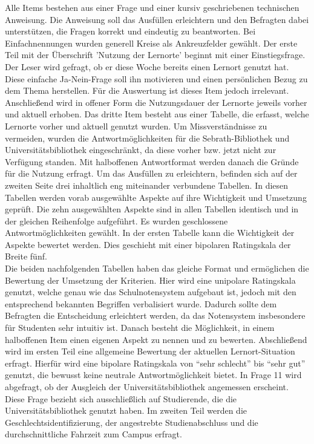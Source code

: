 \documentclass[11pt, a4paper]{article}
\begin{document}
Alle Items bestehen aus einer Frage und einer kursiv geschriebenen technischen Anweisung. Die Anweisung soll das Ausfüllen erleichtern und den Befragten dabei unterstützen, die Fragen korrekt und eindeutig zu beantworten. Bei Einfachnennungen wurden generell Kreise als Ankreuzfelder gewählt.
Der erste Teil mit der Überschrift 'Nutzung der Lernorte' beginnt mit einer Einstiegsfrage.
Der Leser wird gefragt, ob er diese Woche bereits einen Lernort genutzt hat. Diese einfache Ja-Nein-Frage soll ihn motivieren und einen persönlichen Bezug zu dem Thema herstellen. Für die Auswertung ist dieses Item jedoch irrelevant.\\

Anschließend wird in offener Form die Nutzungsdauer der Lernorte jeweils vorher und aktuell erhoben. Das dritte Item besteht aus einer Tabelle, die erfasst, welche Lernorte vorher und aktuell genutzt wurden.
Um Missverständnisse zu vermeiden, wurden die Antwortmöglichkeiten für die Sebrath-Bibliothek und Universitätsbibliothek eingeschränkt, da diese vorher bzw. jetzt nicht zur Verfügung standen.
Mit halboffenen Antwortformat werden danach die Gründe für die Nutzung erfragt.
Um das Ausfüllen zu erleichtern, befinden sich auf der zweiten Seite drei inhaltlich eng miteinander verbundene Tabellen. In diesen Tabellen werden vorab ausgewählte Aspekte auf ihre Wichtigkeit und Umsetzung geprüft. Die zehn ausgewählten Aspekte sind in allen Tabellen identisch und  in der gleichen Reihenfolge aufgeführt. Es wurden geschlossene Antwortmöglichkeiten gewählt.
In der ersten Tabelle kann die Wichtigkeit der Aspekte bewertet werden. Dies geschieht mit einer bipolaren Ratingskala der Breite fünf.\\

Die beiden nachfolgenden Tabellen haben das gleiche Format und ermöglichen die Bewertung der Umsetzung der Kriterien. Hier wird eine unipolare Ratingskala genutzt, welche genau wie das Schulnotensystem aufgebaut ist, jedoch
mit den entsprechend bekannten Begriffen verbalisiert wurde.
Dadurch sollte dem Befragten die Entscheidung erleichtert werden, da das Notensystem insbesondere für Studenten sehr intuitiv ist. 
Danach besteht die Möglichkeit, in einem halboffenen Item einen eigenen Aspekt zu nennen und zu bewerten.
Abschließend wird im ersten Teil eine allgemeine Bewertung der aktuellen Lernort-Situation erfragt.
Hierfür wird eine bipolare Ratingskala von “sehr schlecht” bis “sehr gut” genutzt, die bewusst keine neutrale Antwortmöglichkeit bietet.
In Frage 11 wird abgefragt, ob der Ausgleich der Universitätsbibliothek angemessen erscheint. Diese Frage bezieht sich ausschließlich auf Studierende, die die Universitätsbibliothek genutzt haben.
Im zweiten Teil werden die Geschlechtsidentifizierung, der angestrebte Studienabschluss und die durchschnittliche Fahrzeit zum Campus erfragt.\\
\end{document}
